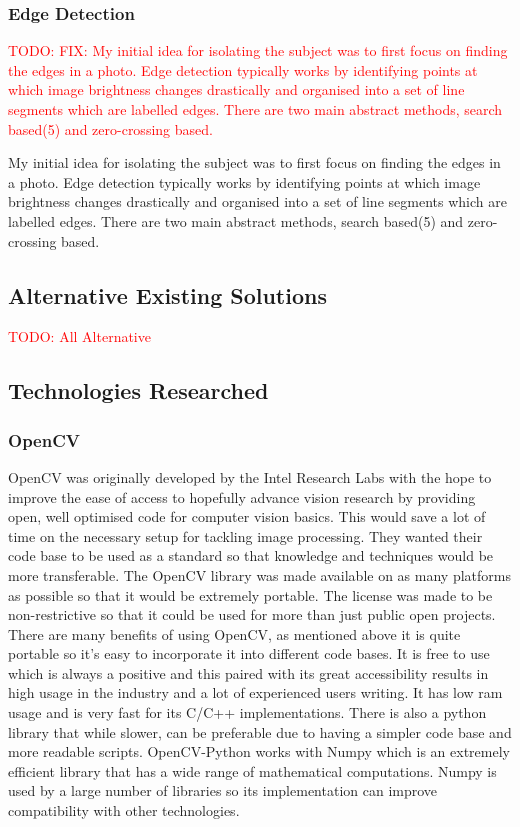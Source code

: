 \documentclass[12pt]{article}
\begin{document}
        \subsubsection{Edge Detection}
\textcolor{red}{TODO: FIX: My initial idea for isolating the subject was to first focus on finding the edges in a photo. Edge detection typically works by identifying points at which image brightness changes drastically and organised into a set of line segments which are labelled edges. There are two main abstract methods, search based(5) and zero-crossing based.}

My initial idea for isolating the subject was to first focus on finding the edges in a photo. Edge detection typically works by identifying points at which image brightness changes drastically and organised into a set of line segments which are labelled edges. There are two main abstract methods, search based(5) and zero-crossing based.



    \subsection{Alternative Existing Solutions}
    \textcolor{red}{TODO: All Alternative}

    \subsection{Technologies Researched}
        \subsubsection{OpenCV}
OpenCV\cite{technologyOpenCVQuote} was originally developed by the Intel Research Labs with the hope to improve the ease of access to hopefully advance vision research by providing open, well optimised code for computer vision basics. This would save a lot of time on the necessary setup for tackling image processing. They wanted their code base to be used as a standard so that knowledge and techniques would be more transferable. The OpenCV library was made available on as many platforms as possible so that it would be extremely portable. The license was made to be non-restrictive so that it could be used for more than just public open projects.\bigbreak 
\noindent
There are many benefits of using OpenCV, as mentioned above it is quite portable so it’s easy to incorporate it into different code bases.
It is free to use which is always a positive and this paired with its great accessibility results in high usage in the industry and a lot of experienced users writing.\bigbreak 
\noindent
It has low ram usage and is very fast for its C/C++ implementations. There is also a python library that while slower, can be preferable due to having a simpler code base and more readable scripts. OpenCV-Python works with Numpy which is an extremely efficient library that has a wide range of mathematical computations. Numpy is used by a large number of libraries so its implementation can improve compatibility with other technologies.
\end{document}
